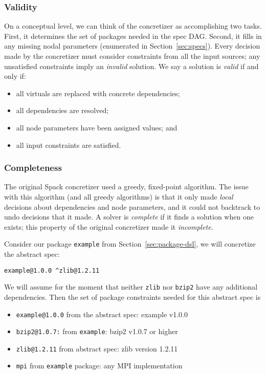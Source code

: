 \subsubsection{Validity}

On a conceptual level, we can think of the concretizer as accomplishing two tasks.
First, it determines the set of packages needed in the spec DAG. Second, it fills in any
missing nodal parameters (enumerated in Section~\ref{sec:specs}). Every decision made by
the concretizer must consider constraints from all the input sources; any unsatisfied
constraints imply an {\it invalid} solution. We say a solution is {\it valid} if and only if:
\begin{itemize}
\item all virtuals are replaced with concrete dependencies;
\item all dependencies are resolved;
\item all node parameters have been assigned values; and
\item all input constraints are satisfied.
\end{itemize}

\subsubsection{Completeness}
The original Spack concretizer used a greedy, fixed-point algorithm. The issue with this
algorithm (and all greedy algorithms) is that it only made {\it local} decisions about
dependencies and node parameters, and it could not backtrack to undo decisions that it
made. A solver is {\it complete} if it finds a solution when one exists; this property
of the original concretizer made it {\it incomplete}.

Consider our package \texttt{example} from Section~\ref{sec:package-dsl}, we will
concretize the abstract spec:
\begin{verbatim}
example@1.0.0 ^zlib@1.2.11
\end{verbatim}
We will assume for the moment that neither \texttt{zlib} nor \texttt{bzip2} have any
additional dependencies. Then the set of package constraints needed for this
abstract spec is

\begin{itemize}
\item {\tt example@1.0.0} from the abstract spec: example v1.0.0
\item {\tt bzip2@1.0.7:} from {\tt example}: bzip2 v1.0.7 or higher
\item {\tt zlib@1.2.11} from abstract spec: zlib version 1.2.11
\item {\tt mpi} from {\tt example} package: any MPI implementation
\end{itemize}

